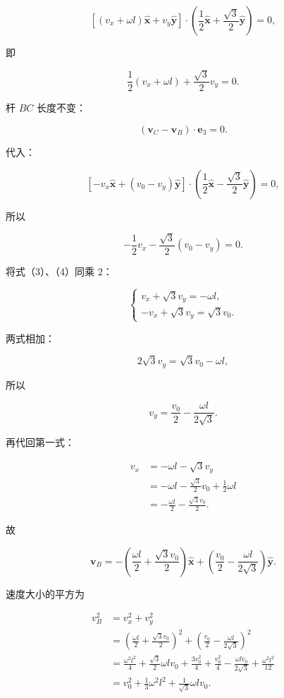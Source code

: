 \documentclass[12pt,a4paper,UTF8]{ctexart}
\begin{document}
\[
\left[(v_x+\omega l)\hat{\bm x}+v_y\hat{\bm y}\right]
\cdot
\left(\frac12\hat{\bm x}+\frac{\sqrt3}{2}\hat{\bm y}\right)=0,
\]

即

\[\frac12(v_x+\omega l)+\frac{\sqrt3}{2}v_y=0. \tag{3}\]

杆 \(BC\) 长度不变：

\[
(\bm v_C-\bm v_B)\cdot\bm e_3=0.
\]

代入：

\[
\left[-v_x\hat{\bm x}+(v_0-v_y)\hat{\bm y}\right]
\cdot
\left(\frac12\hat{\bm x}-\frac{\sqrt3}{2}\hat{\bm y}\right)=0,
\]

所以

\[-\frac12v_x-\frac{\sqrt3}{2}(v_0-v_y)=0. \tag{4}\]

将式（3）、（4）同乘 \(2\)：

\[
\begin{cases}
v_x+\sqrt3v_y=-\omega l,\\
-v_x+\sqrt3v_y=\sqrt3v_0.
\end{cases}
\]

两式相加：

\[2\sqrt3v_y=\sqrt3v_0-\omega l,\]

所以

\[v_y=\frac{v_0}{2}-\frac{\omega l}{2\sqrt3}.\]

再代回第一式：

\[
\begin{aligned}
v_x
&=-\omega l-\sqrt3v_y\\
&=-\omega l-\frac{\sqrt3}{2}v_0+\frac12\omega l\\
&=-\frac{\omega l}{2}-\frac{\sqrt3v_0}{2}.
\end{aligned}
\]

故

\[\boxed{
\bm v_B=
-\left(\frac{\omega l}{2}+\frac{\sqrt3v_0}{2}\right)\hat{\bm x}
+\left(\frac{v_0}{2}-\frac{\omega l}{2\sqrt3}\right)\hat{\bm y}
}. \tag{5}\]

速度大小的平方为

\[
\begin{aligned}
v_B^2
&=v_x^2+v_y^2\\
&=\left(\frac{\omega l}{2}+\frac{\sqrt3v_0}{2}\right)^2
+\left(\frac{v_0}{2}-\frac{\omega l}{2\sqrt3}\right)^2\\
&=\frac{\omega^2l^2}{4}+\frac{\sqrt3}{2}\omega lv_0+\frac{3v_0^2}{4}
+\frac{v_0^2}{4}-\frac{\omega lv_0}{2\sqrt3}+\frac{\omega^2l^2}{12}\\
&=v_0^2+\frac13\omega^2l^2+\frac1{\sqrt3}\omega lv_0.
\end{aligned}
\]
\end{document}
